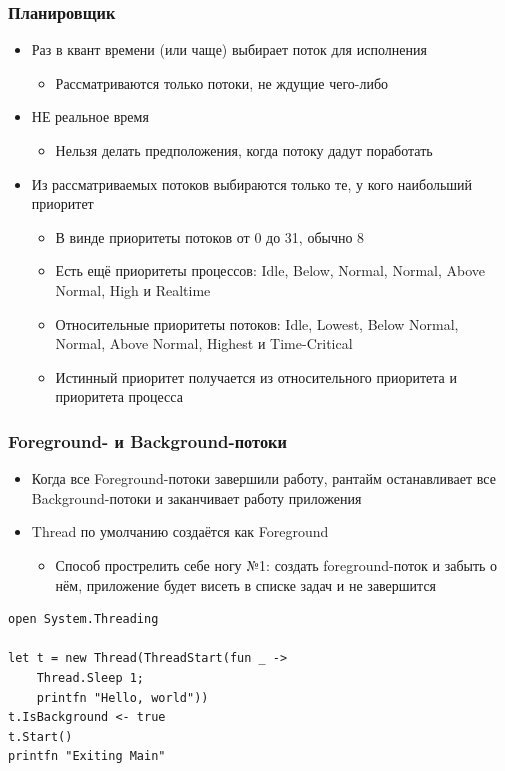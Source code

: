 \documentclass[xetex,mathserif,serif]{beamer}
\begin{document}
	\begin{frame}
		\frametitle{Планировщик}
		\begin{itemize}
			\item Раз в квант времени (или чаще) выбирает поток для исполнения
			\begin{itemize}
				\item Рассматриваются только потоки, не ждущие чего-либо
			\end{itemize}
			\item НЕ реальное время
			\begin{itemize}
				\item Нельзя делать предположения, когда потоку дадут поработать
			\end{itemize}
			\item Из рассматриваемых потоков выбираются только те, у кого наибольший приоритет
			\begin{itemize}
				\item В винде приоритеты потоков от 0 до 31, обычно 8
				\item Есть ещё приоритеты процессов: Idle, Below, Normal, Normal, Above Normal, High и Realtime
				\item Относительные приоритеты потоков: Idle, Lowest, Below Normal, Normal, Above Normal, Highest и Time-Critical
				\item Истинный приоритет получается из относительного приоритета и приоритета процесса
			\end{itemize}
		\end{itemize}
	\end{frame}

	\begin{frame}[fragile]
		\frametitle{Foreground- и Background-потоки}
		\begin{itemize}
			\item Когда все Foreground-потоки завершили работу, рантайм останавливает все Background-потоки и заканчивает работу приложения
			\item Thread по умолчанию создаётся как Foreground
			\begin{itemize}
				\item Способ прострелить себе ногу №1: создать foreground-поток и забыть о нём, приложение будет висеть в списке задач и не завершится
			\end{itemize}
		\end{itemize}
		\begin{verbatim}
open System.Threading

let t = new Thread(ThreadStart(fun _ -> 
    Thread.Sleep 1; 
    printfn "Hello, world"))
t.IsBackground <- true
t.Start()
printfn "Exiting Main"
		\end{verbatim}
\end{frame}
\end{document}
